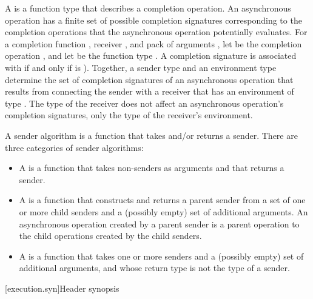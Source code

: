 \pnum
A  is a function type
that describes a completion operation.
An asynchronous operation has a finite set of possible completion signatures
corresponding to the completion operations
that the asynchronous operation potentially evaluates.
For a completion function ,
receiver , and
pack of arguments ,
let  be the completion operation , and
let  be
the function type .
A completion signature  is associated with 
if and only if
 is ).
Together, a sender type and an environment type  determine
the set of completion signatures of an asynchronous operation
that results from connecting the sender with a receiver
that has an environment of type .
The type of the receiver does not affect
an asynchronous operation's completion signatures,
only the type of the receiver's environment.

\pnum
A sender algorithm is a function that takes and/or returns a sender.
There are three categories of sender algorithms:
\begin{itemize}
\item
A  is a function
that takes non-senders as arguments and that returns a sender.
\item
A  is a function
that constructs and returns a parent sender
from a set of one or more child senders and
a (possibly empty) set of additional arguments.
An asynchronous operation created by a parent sender is
a parent operation to the child operations created by the child senders.
\item
A  is a function
that takes one or more senders and
a (possibly empty) set of additional arguments, and
whose return type is not the type of a sender.
\end{itemize}

[execution.syn]{Header  synopsis}

